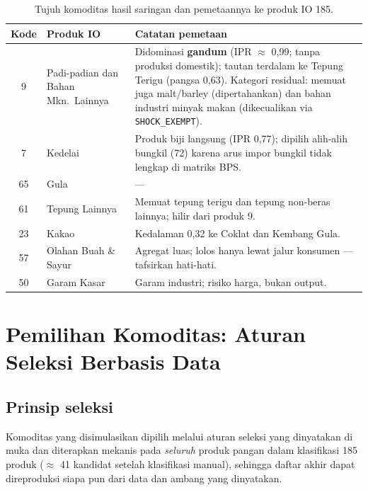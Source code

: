 \documentclass[11pt,a4paper]{article}
\begin{document}
\begin{table}[ht]
\centering\small
\caption{Tujuh komoditas hasil saringan dan pemetaannya ke produk IO 185.}
\label{tab:mapping}
\begin{tabular}{@{}clp{7.2cm}@{}}
\toprule
\textbf{Kode} & \textbf{Produk IO} & \textbf{Catatan pemetaan} \\
\midrule
9  & Padi-padian dan Bahan Mkn.\ Lainnya &
     Didominasi \textbf{gandum} (IPR $\approx$ 0{,}99; tanpa produksi
     domestik); tautan terdalam ke Tepung Terigu (pangsa 0{,}63). Kategori
     residual: memuat juga malt/barley (dipertahankan) dan bahan industri
     minyak makan (dikecualikan via \texttt{SHOCK\_EXEMPT}). \\
7  & Kedelai &
     Produk biji langsung (IPR 0{,}77); dipilih alih-alih bungkil (72)
     karena arus impor bungkil tidak lengkap di matriks BPS. \\
65 & Gula & --- \\
61 & Tepung Lainnya &
     Memuat tepung terigu dan tepung non-beras lainnya; hilir dari
     produk 9. \\
23 & Kakao & Kedalaman 0{,}32 ke Coklat dan Kembang Gula. \\
57 & Olahan Buah \& Sayur &
     Agregat luas; lolos hanya lewat jalur konsumen --- tafsirkan
     hati-hati. \\
50 & Garam Kasar & Garam industri; risiko harga, bukan output. \\
\bottomrule
\end{tabular}
\end{table}

\section{Pemilihan Komoditas: Aturan Seleksi Berbasis Data}
\label{sec:screening}

\subsection{Prinsip seleksi}

Komoditas yang disimulasikan dipilih melalui aturan seleksi yang
dinyatakan di muka dan diterapkan mekanis pada \emph{seluruh} produk
pangan dalam klasifikasi 185 produk ($\approx$ 41 kandidat setelah
klasifikasi manual), sehingga daftar akhir dapat direproduksi siapa pun
dari data dan ambang yang dinyatakan.
\end{document}
